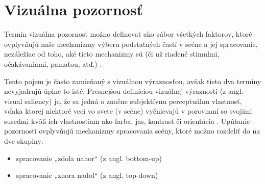 \newpage

\section{Vizuálna pozornosť}
\label{saliency}
	
Termín vizuálna pozornosť možno definovať ako súbor všetkých faktorov, ktoré ovplyvňujú naše mechanizmy výberu podstatných častí v scéne a jej spracovanie, nezáležiac od toho, aké tieto mechanizmy sú (či už riadené stimulmi, očakávaniami, pamaťou, atď.) \cite{borji2013state}.

Tento pojem je často zamieňaný s vizuálnou výraznosťou, avšak tieto dva termíny nevyjadrujú úplne to isté. Presnejšou definíciou vizuálnej výraznosti (z angl. visual saliency) je, že sa jedná o značne subjektívnu perceptuálnu vlastnosť, vďaka ktorej niektoré veci vo svete (v scéne) vyčnievajú v porovnaní so svojimi susedmi kvôli ich vlastnostiam ako farba, jas, kontrast či orientácia \cite{itti2007visual}. Upútanie pozornosti ovplyvňujú mechanizmy spracovania scény, ktoré možno rozdeliť do na dve skupiny:
\begin{itemize}
	\item spracovanie „zdola nahor“ (z angl. bottom-up) %
	\item spracovanie „zhora nadol“ (z angl. top-down) %
	
\end{itemize}



